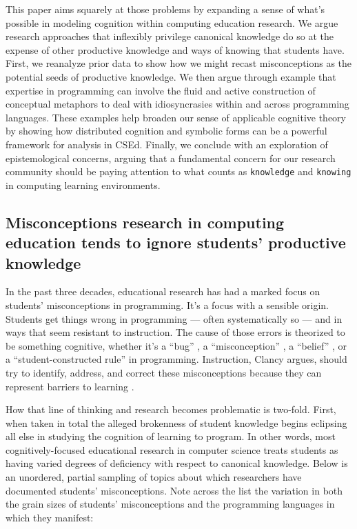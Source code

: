 This paper aims squarely at those problems by expanding a sense of what's possible in modeling cognition within computing education research. We argue research
approaches that inflexibly privilege canonical knowledge do so at the
expense of other productive knowledge and ways of knowing that students
have. First, we reanalyze prior data to show how we might recast misconceptions as the potential seeds of productive knowledge. We then argue through example that expertise in programming can involve the fluid and active construction of conceptual metaphors to deal with idiosyncrasies within and across programming languages. These examples help broaden our sense of applicable cognitive theory by showing how distributed cognition and symbolic forms can be a powerful framework for analysis in CSEd. Finally, we conclude with an exploration of epistemological concerns, arguing that a fundamental concern for our research community should be paying attention to what counts as \texttt{knowledge} and \texttt{knowing} in computing learning environments.

\subsection{Misconceptions research in computing education tends to
ignore students' productive
knowledge}\label{misconceptions-research-in-computing-education-tends-to-ignore-students-productive-knowledge}



In the past three decades, educational research has had a marked focus
on students' misconceptions in programming. It's a focus with a sensible
origin. Students get things wrong in programming --- often
systematically so --- and in ways that seem resistant to instruction.
The cause of those errors is theorized to be something cognitive,
whether it's a ``bug'' \cite{pea_buggy_1987,pea_languageindependent_1986,vanlehn_mind_1990}, a
``misconception'' \cite{bayman_diagnosis_1983,bonar_preprogramming_1985,clancy_misconceptions_2004,gal-ezer_efficiency_2004,herman_proof_2008,kaczmarczyk_identifying_2010}, a ``belief'' \cite{fleury_student_1993}, or a ``student-constructed
rule'' \cite{fleury_parameter_1991,fleury_programming_2000} in programming. Instruction, Clancy argues, should try to identify,
address, and correct these misconceptions because they
can represent barriers to learning \cite{clancy_misconceptions_2004}.

How that line of thinking and research becomes problematic is two-fold.
First, when taken in total the alleged brokenness of student knowledge
begins eclipsing all else in studying the cognition of learning to
program. In other words, most cognitively-focused educational research
in computer science treats students as having varied degrees of
deficiency with respect to canonical knowledge. Below is an unordered,
partial sampling of topics about which researchers have documented
students' misconceptions. Note across the list the variation in both the
grain sizes of students' misconceptions and the programming languages in
which they manifest:

